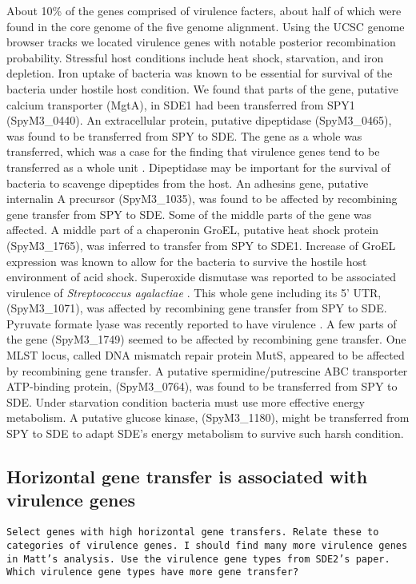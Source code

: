 \documentclass[english]{article}
\begin{document}
About 10\% of the genes comprised of virulence facters, about half of which were
found in the core genome of the five genome alignment. Using the UCSC genome
browser tracks we located virulence genes with notable posterior recombination
probability.  Stressful host conditions include heat shock, starvation, and iron
depletion.  Iron uptake of bacteria was known to be essential for survival of
the bacteria under hostile host condition. We found that parts of the gene,
putative calcium transporter (MgtA), in SDE1 had been transferred from SPY1
(SpyM3\_0440).  An extracellular protein, putative dipeptidase (SpyM3\_0465),
was found to be transferred from SPY to SDE. The gene as a whole was
transferred, which was a case for the finding that virulence genes tend to be
transferred as a whole unit \citep{Chan2009}. Dipeptidase may be important for
the survival of bacteria to scavenge dipeptides from the host.  An adhesins
gene, putative internalin A precursor (SpyM3\_1035), was found to be affected by
recombining gene transfer from SPY to SDE. Some of the middle parts of the gene
was affected.  A middle part of a chaperonin GroEL, putative heat shock protein
(SpyM3\_1765), was inferred to transfer from SPY to SDE1.  Increase of GroEL
expression was known to allow for the bacteria to survive the hostile host
environment of acid shock.  Superoxide dismutase was reported to be associated
virulence of \textit{Streptococcus agalactiae} \citep{Poyart2001}. This whole
gene including its 5' UTR, (SpyM3\_1071), was affected by recombining gene
transfer from SPY to SDE.  Pyruvate formate lyase was recently reported to have
virulence \citep{Yesilkaya2009}. A few parts of the gene (SpyM3\_1749) seemed to
be affected by recombining gene transfer.  One MLST locus, called DNA mismatch
repair protein MutS, appeared to be affected by recombining gene transfer.  A
putative spermidine/putrescine ABC transporter ATP-binding protein,
(SpyM3\_0764), was found to be transferred from SPY to SDE.  Under starvation
condition bacteria must use more effective energy metabolism.  A putative
glucose kinase, (SpyM3\_1180), might be transferred from SPY to SDE to adapt
SDE's energy metabolism to survive such harsh condition.  

\subsection{Horizontal gene transfer is associated with virulence genes}

\texttt{Select genes with high horizontal gene transfers. Relate these to
categories of virulence genes. I should find many more virulence genes in Matt's
analysis. Use the virulence gene types from SDE2's paper. Which virulence gene
types have more gene transfer?}
\end{document}
